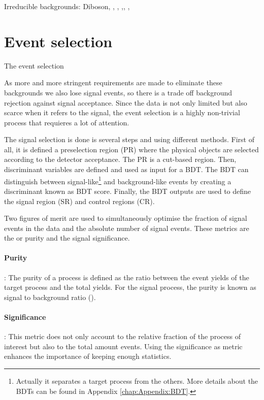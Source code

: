 Irreducible backgrounds: Diboson, \tW, \ttZ, \ttH,\ttW, \tZq,



\section{Event selection}
\label{sec:ChaptH:EventSelection}
The event selection 


As more and more stringent requirements are made to eliminate these backgrounds we also 
lose signal events, so there is a trade off background rejection against signal acceptance. 
Since the data is not only limited but also scarce when it refers to the \tHq signal, the event selection
is a highly non-trivial process that requieres a lot of attention. 

The signal selection is done is several steps and using different methods. First of all, it is defined a 
preselection region (PR) where the physical objects are selected according to the detector acceptance. 
The PR is a cut-based region. %
Then, discriminant variables are defined and used as input for a BDT. The BDT can distinguish between
signal-like\footnote{Actually it separates a target process from the others. More details about the BDTs
can be found in Appendix \ref{chap:Appendix:BDT}.} and background-like events by creating a discriminant 
known as BDT score.
Finally, the BDT outputs are used to define the signal region (SR) and control regions (CR).


Two figures of merit are used to simultaneously optimise the fraction of signal events in the data and the
absolute number of signal events. These metrics are the \StoB or purity and the signal significance. 

\paragraph{Purity}: 	The purity of a process is defined as the ratio between the 
				event yields of the target process and the total yields. For the signal process, 
				the purity is known as signal to background ratio (\StoB).
\paragraph{Significance}:	This metric does not only account to the relative fraction of the
					process of interest but also to the total amount events. Using
					the significance as metric enhances the importance of keeping 
					enough statistics. 
					
